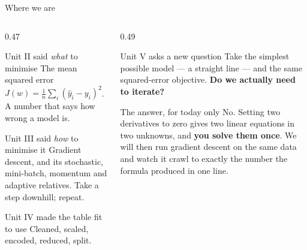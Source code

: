 \documentclass[aspectratio=169]{beamer}
\begin{document}
\begin{frame}[shrink=5]{Where we are}
  \begin{columns}[T]
    \begin{column}{0.47\textwidth}
      \begin{block}{Unit II said \emph{what} to minimise}
        The mean squared error
        $J(w) = \frac1n\sum_i (\hat y_i - y_i)^2$. A number that says how
        wrong a model is.
      \end{block}
      \begin{block}{Unit III said \emph{how} to minimise it}
        Gradient descent, and its stochastic, mini-batch, momentum and
        adaptive relatives. Take a step downhill; repeat.
      \end{block}
      \begin{block}{Unit IV made the table fit to use}
        Cleaned, scaled, encoded, reduced, split.
      \end{block}
    \end{column}
    \begin{column}{0.49\textwidth}
      \begin{exampleblock}{Unit V asks a new question}
        Take the simplest possible model --- a straight line --- and the same
        squared-error objective. \textbf{Do we actually need to iterate?}
      \end{exampleblock}
      \begin{alertblock}{The answer, for today only}
        No. Setting two derivatives to zero gives two linear equations in two
        unknowns, and \textbf{you solve them once}. We will then run gradient
        descent on the same data and watch it crawl to exactly the number the
        formula produced in one line.
      \end{alertblock}
    \end{column}
  \end{columns}
\end{frame}
\end{document}
